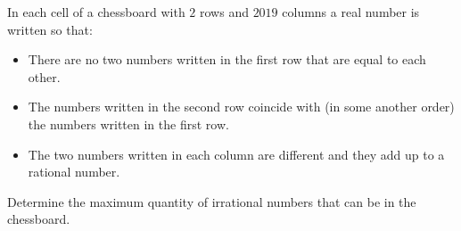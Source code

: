 In each cell of a chessboard with $2$ rows and $2019$ columns a real number is written so that:
\begin{itemize}
	\item There are no two numbers written in the first row that are equal to each other.
	\item The numbers written in the second row coincide with (in some another order) the numbers written in the first row.
	\item The two numbers written in each column are different and they add up to a rational number.
\end{itemize}
Determine the maximum quantity of irrational numbers that can be in the chessboard.